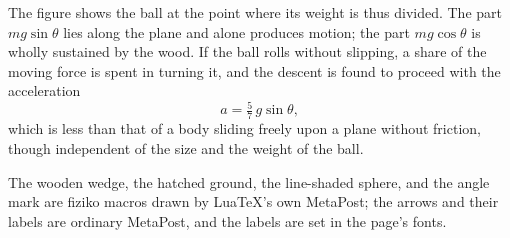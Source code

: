 \documentclass[11pt]{article}
\begin{document}
\vspace{.4em}
\noindent
The figure shows the ball at the point where its weight is thus divided. The
part $mg\sin\theta$ lies along the plane and alone produces motion; the part
$mg\cos\theta$ is wholly sustained by the wood. If the ball rolls without
slipping, a share of the moving force is spent in turning it, and the
descent is found to proceed with the acceleration
\[
  a = \tfrac{5}{7}\, g \sin\theta ,
\]
which is less than that of a body sliding freely upon a plane without
friction, though independent of the size and the weight of the ball.

\vspace{.4em}
\noindent\footnotesize
The wooden wedge, the hatched ground, the line-shaded sphere, and the angle
mark are fiziko macros drawn by LuaTeX's own MetaPost; the arrows and their
labels are ordinary MetaPost, and the labels are set in the page's fonts.

\vfill
\begin{center}
  {\scriptsize{}}
\end{center}
\end{document}
